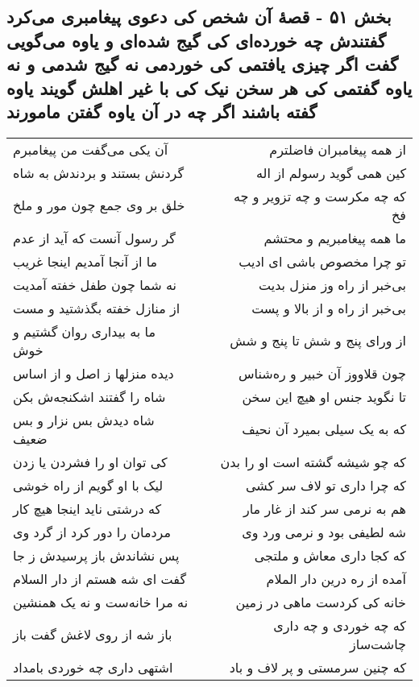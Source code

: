 \begin{center}
\section*{بخش ۵۱ - قصهٔ آن شخص کی دعوی پیغامبری می‌کرد گفتندش چه خورده‌ای کی گیج شده‌ای و یاوه می‌گویی گفت اگر چیزی یافتمی کی خوردمی نه گیج شدمی و نه یاوه گفتمی کی هر سخن نیک کی با غیر اهلش گویند یاوه گفته باشند اگر چه در آن یاوه گفتن مامورند}
\label{sec:sh051}
\begin{longtable}{l p{0.5cm} r}
آن یکی می‌گفت من پیغامبرم
&&
از همه پیغامبران فاضلترم
\\
گردنش بستند و بردندش به شاه
&&
کین همی گوید رسولم از اله
\\
خلق بر وی جمع چون مور و ملخ
&&
که چه مکرست و چه تزویر و چه فخ
\\
گر رسول آنست که آید از عدم
&&
ما همه پیغامبریم و محتشم
\\
ما از آنجا آمدیم اینجا غریب
&&
تو چرا مخصوص باشی ای ادیب
\\
نه شما چون طفل خفته آمدیت
&&
بی‌خبر از راه وز منزل بدیت
\\
از منازل خفته بگذشتید و مست
&&
بی‌خبر از راه و از بالا و پست
\\
ما به بیداری روان گشتیم و خوش
&&
از ورای پنج و شش تا پنج و شش
\\
دیده منزلها ز اصل و از اساس
&&
چون قلاووز آن خبیر و ره‌شناس
\\
شاه را گفتند اشکنجه‌ش بکن
&&
تا نگوید جنس او هیچ این سخن
\\
شاه دیدش بس نزار و بس ضعیف
&&
که به یک سیلی بمیرد آن نحیف
\\
کی توان او را فشردن یا زدن
&&
که چو شیشه گشته است او را بدن
\\
لیک با او گویم از راه خوشی
&&
که چرا داری تو لاف سر کشی
\\
که درشتی ناید اینجا هیچ کار
&&
هم به نرمی سر کند از غار مار
\\
مردمان را دور کرد از گرد وی
&&
شه لطیفی بود و نرمی ورد وی
\\
پس نشاندش باز پرسیدش ز جا
&&
که کجا داری معاش و ملتجی
\\
گفت ای شه هستم از دار السلام
&&
آمده از ره درین دار الملام
\\
نه مرا خانه‌ست و نه یک همنشین
&&
خانه کی کردست ماهی در زمین
\\
باز شه از روی لاغش گفت باز
&&
که چه خوردی و چه داری چاشت‌ساز
\\
اشتهی داری چه خوردی بامداد
&&
که چنین سرمستی و پر لاف و باد
\\

\end{longtable}
\end{center}
